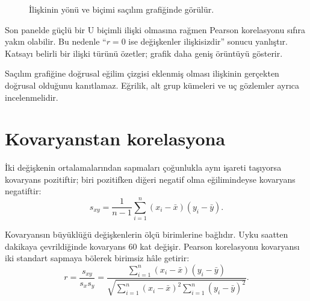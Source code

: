\begin{figure}[htbp]
\centering
{}
\caption{İlişkinin yönü ve biçimi saçılım grafiğinde görülür.}
\end{figure}

Son panelde güçlü bir U biçimli ilişki olmasına rağmen Pearson korelasyonu
sıfıra yakın olabilir. Bu nedenle ``$r=0$ ise değişkenler ilişkisizdir''
sonucu yanlıştır. Katsayı belirli bir ilişki türünü özetler; grafik daha geniş
örüntüyü gösterir.

\begin{mistakebox}
Saçılım grafiğine doğrusal eğilim çizgisi eklenmiş olması ilişkinin gerçekten
doğrusal olduğunu kanıtlamaz. Eğrilik, alt grup kümeleri ve uç gözlemler ayrıca
incelenmelidir.
\end{mistakebox}

\section{Kovaryanstan korelasyona}

İki değişkenin ortalamalarından sapmaları çoğunlukla aynı işareti taşıyorsa
kovaryans pozitiftir; biri pozitifken diğeri negatif olma eğilimindeyse
kovaryans negatiftir:
\[
s_{xy}=\frac{1}{n-1}
\sum_{i=1}^n(x_i-\bar x)(y_i-\bar y).
\]

Kovaryansın büyüklüğü değişkenlerin ölçü birimlerine bağlıdır. Uyku saatten
dakikaya çevrildiğinde kovaryans 60 kat değişir. Pearson korelasyonu
kovaryansı iki standart sapmaya bölerek birimsiz hâle getirir:
\[
r=\frac{s_{xy}}{s_xs_y}
=\frac{\sum_{i=1}^n(x_i-\bar x)(y_i-\bar y)}
{\sqrt{\sum_{i=1}^n(x_i-\bar x)^2
             \sum_{i=1}^n(y_i-\bar y)^2}}.
\]

